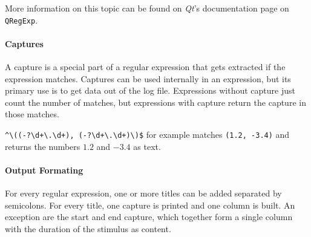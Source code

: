 More information on this topic can be found on \textit{Qt}'s documentation page on \lstinline{QRegExp}\cite{regexp}.

\paragraph{Captures}
A capture is a special part of a regular expression that gets extracted if the expression matches.
Captures can be used internally in an expression, but its primary use is to get data out of the log file.
Expressions without capture just count the number of matches, but expressions with capture return the capture in those matches.

\verb|^\((-?\d+\.\d+), (-?\d+\.\d+)\)$| for example matches \texttt{(1.2, -3.4)} and returns the numbers $1.2$ and $-3.4$ as text.

\paragraph{Output Formating}
For every regular expression, one or more titles can be added separated by semicolons.
For every title, one capture is printed and one column is built.
An exception are the start and end capture, which together form a single column with the duration of the stimulus as content.

